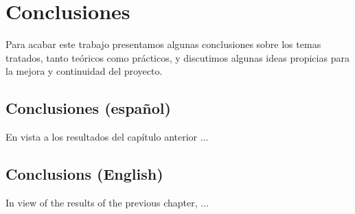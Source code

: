 \chapter{Conclusiones}
\label{cha:concl}
Para acabar este trabajo presentamos algunas conclusiones sobre los temas tratados, tanto teóricos como prácticos, y discutimos algunas ideas propicias para la mejora y continuidad del proyecto.
\section{Conclusiones (español)}
En vista a los resultados del capítulo anterior $\ldots$

\section{Conclusions (English)}
In view of the results of the previous chapter, $\ldots$


